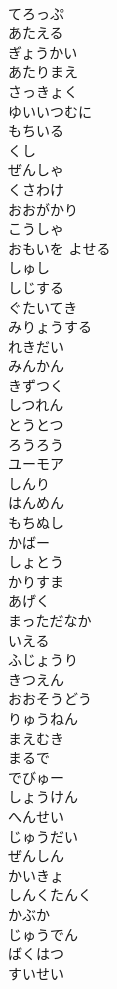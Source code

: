 \documentclass[8pt]{extreport}
\begin{document}
\begin{CJK}{UTF8}{min}
\\	てろっぷ
\\	あたえる
\\	ぎょうかい
\\	あたりまえ
\\	さっきょく
\\	ゆいいつむに
\\	もちいる
\\	くし
\\	ぜんしゃ
\\	くさわけ
\\	おおがかり
\\	こうしゃ
\\	おもいを よせる
\\	しゅし
\\	しじする
\\	ぐたいてき
\\	みりょうする
\\	れきだい
\\	みんかん
\\	きずつく
\\	しつれん
\\	とうとつ
\\	ろうろう
\\	ユーモア
\\	しんり
\\	はんめん
\\	もちぬし
\\	かばー
\\	しょとう
\\	かりすま
\\	あげく
\\	まっただなか
\\	いえる
\\	ふじょうり
\\	きつえん
\\	おおそうどう
\\	りゅうねん
\\	まえむき
\\	まるで
\\	でびゅー
\\	しょうけん
\\	へんせい
\\	じゅうだい
\\	ぜんしん
\\	かいきょ
\\	しんくたんく
\\	かぶか
\\	じゅうでん
\\	ばくはつ
\\	すいせい

\end{CJK}
\end{document}
